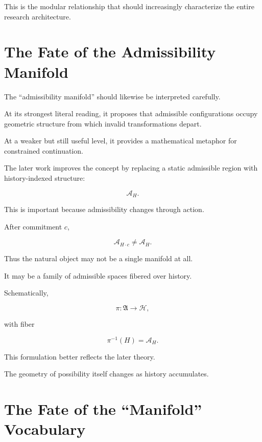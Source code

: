 \documentclass[11pt]{article}
\theoremstyle{remark}
\begin{document}
This is the modular relationship that should increasingly characterize the entire research architecture.

\section{The Fate of the Admissibility Manifold}

The ``admissibility manifold'' should likewise be interpreted carefully.

At its strongest literal reading, it proposes that admissible configurations occupy geometric structure from which invalid transformations depart.

At a weaker but still useful level, it provides a mathematical metaphor for constrained continuation.

The later work improves the concept by replacing a static admissible region with history-indexed structure:

\begin{equation}
\mathcal{A}_H.
\end{equation}

This is important because admissibility changes through action.

After commitment $c$,

\begin{equation}
\mathcal{A}_{H\cdot c}
\neq
\mathcal{A}_H.
\end{equation}

Thus the natural object may not be a single manifold at all.

It may be a family of admissible spaces fibered over history.

Schematically,

\begin{equation}
\pi:\mathfrak{A}\rightarrow\mathcal{H},
\end{equation}

with fiber

\begin{equation}
\pi^{-1}(H)=\mathcal{A}_H.
\end{equation}

This formulation better reflects the later theory.

The geometry of possibility itself changes as history accumulates.

\section{The Fate of the ``Manifold'' Vocabulary}
\end{document}
